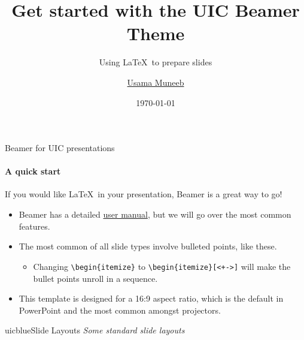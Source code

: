 \documentclass{beamer}
\title{Get started with the UIC Beamer Theme}
\subtitle{Using \LaTeX\ to prepare slides}
\author{\href{mailto:umunee2@uic.edu}{Usama Muneeb}}
\date{\today}
\newcommand{\hrefcol}[2]{\textcolor{uihteal}{\href{#1}{#2}}}
\begin{document}
\maketitle
{} %



\begin{frame}[fragile]{Beamer for UIC presentations}
\framesubtitle{A quick start}
If you would like \LaTeX\ in your presentation, Beamer is a great way to go!
\begin{itemize}
\item Beamer has a detailed
\hrefcol{https://www.ctan.org/tex-archive/macros/latex/contrib/beamer/doc/beameruserguide.pdf}{user
 manual}, but we will go over the most common features.
\item The most common of all slide types involve bulleted points, like these.
\begin{itemize}
\item Changing \verb|\begin{itemize}| to \verb|\begin{itemize}[<+->]| will make the bullet points unroll in a sequence.
\end{itemize}
\item This template is designed for a 16:9 aspect ratio, which is the default in PowerPoint and the most common amongst projectors.
\end{itemize}
\end{frame}


\begin{chapter}{uicblue}{Slide Layouts}
\textit{Some standard slide layouts}
\end{chapter}
\end{document}
